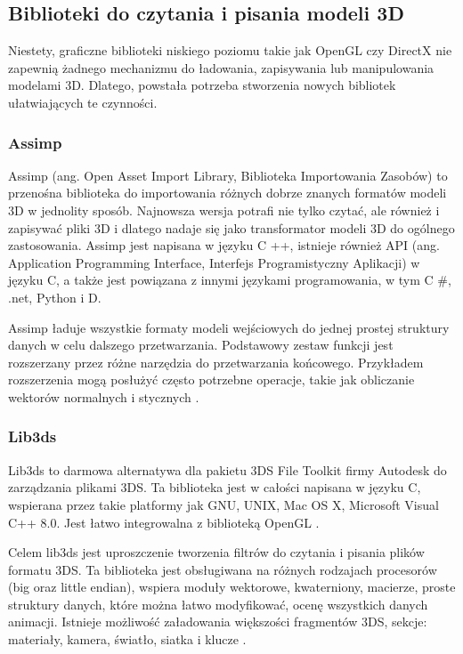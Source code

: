 \newpage
\subsection{Biblioteki do czytania i pisania modeli 3D}
Niestety, graficzne biblioteki niskiego poziomu takie jak OpenGL czy DirectX nie zapewnią żadnego mechanizmu do ładowania, zapisywania lub manipulowania modelami 3D. Dlatego, powstała potrzeba stworzenia nowych bibliotek ułatwiających te czynności. 
\subsubsection{Assimp}
Assimp (ang. Open Asset Import Library, Biblioteka Importowania Zasobów) to przenośna biblioteka do importowania różnych dobrze znanych formatów modeli 3D w jednolity sposób. Najnowsza wersja potrafi nie tylko czytać, ale również i zapisywać pliki 3D i dlatego nadaje się jako transformator modeli 3D do ogólnego zastosowania. Assimp jest napisana w języku C ++, istnieje również API (ang. Application Programming Interface, Interfejs Programistyczny Aplikacji) w języku C, a także jest powiązana z innymi językami programowania, w tym C \#, .net, Python i D.

Assimp ładuje wszystkie formaty modeli wejściowych do jednej prostej struktury danych w celu dalszego przetwarzania. Podstawowy zestaw funkcji jest rozszerzany przez różne narzędzia do przetwarzania końcowego. Przykładem rozszerzenia mogą posłużyć często potrzebne operacje, takie jak obliczanie wektorów normalnych i stycznych \cite{assimp}.
\subsubsection{Lib3ds}
Lib3ds to darmowa alternatywa dla pakietu 3DS File Toolkit firmy Autodesk do zarządzania plikami 3DS. Ta biblioteka jest w całości napisana w języku C, wspierana przez takie platformy jak GNU, UNIX, Mac OS X, Microsoft Visual C++ 8.0. Jest łatwo integrowalna z biblioteką OpenGL \cite{lib3dsofficial}. 

Celem lib3ds jest uproszczenie tworzenia filtrów do czytania i pisania plików formatu 3DS. Ta biblioteka jest obsługiwana na różnych rodzajach procesorów (big oraz little endian), wspiera moduły wektorowe, kwaterniony, macierze, proste struktury danych, które można łatwo modyfikować, ocenę wszystkich danych animacji. Istnieje możliwość załadowania większości fragmentów 3DS, sekcje: materiały, kamera, światło, siatka i klucze \cite{lib3dsdirectory}.

